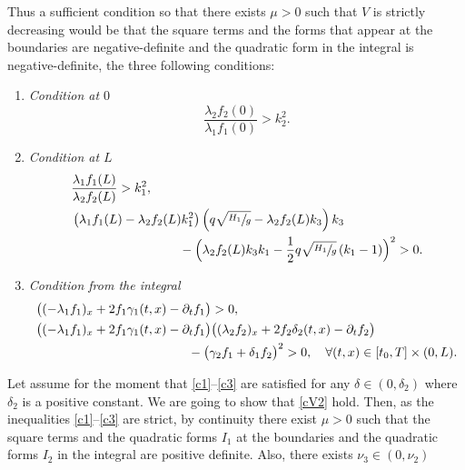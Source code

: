 Thus a sufficient condition {so that there exists $\mu>0$ such} that $V$ is strictly decreasing would be that the square terms and the forms that appear at the boundaries are negative-definite and the quadratic form in the integral is negative-definite, \ie the three following conditions:
\begin{enumerate}
\item \emph{Condition at $0$}
\begin{equation}
\label{c1}
\frac{\lambda_{2}f_{2}(0)}{\lambda_{1}f_{1}(0)}>k_{2}^{2}.
\end{equation}
\item \emph{Condition at $L$}
\begin{subequations}
\label{c2}
\begin{align}
\label{c2a}
&\frac{\lambda_{1}f_{1}(L)}{\lambda_{2}f_{2}(L)}>k_{1}^{2},\\
\label{c2b}
&\left(\lambda_{1}f_{1}(L)-\lambda_{2}f_{2}(L)k_{1}^{2}\right)\left(q\sqrt{\sfrac{H_{1}}{g}}-\lambda_{2}f_{2}(L)k_{3}\right)k_{3}\\
&\hspace*{3cm}-\Bigl(\lambda_{2}f_{2}(L)k_{3}k_{1}-\frac{1}{2}q\sqrt{\sfrac{H_{1}}{g}}\left(k_{1}-1\right)\Bigr)^{2}>0. \notag
\end{align}
\end{subequations}
\item \emph{Condition from the integral}
\begin{equation}\label{c3}
\begin{aligned}
&\bigl((-\lambda_{1}f_{1})_{x}+2f_{1}\gamma_{1}(t,x)-\partial_{t}f_{1}\bigr)>0,
\\
&\bigl((-\lambda_{1}f_{1})_{x}+2f_{1}\gamma_{1}(t,x)-\partial_{t}f_{1}\bigr)\bigl((\lambda_{2}f_{2})_{x}+2f_{2}\delta_{2}(t,x)-\partial_{t}f_{2}\bigr)
\\
& \hspace*{4.2cm}-\bigl(\gamma_{2}f_{1}+\delta_{1}f_{2}\bigr)^{2}>0,\quad\forall (t,x)\in [t_{0},T]\times(0,L).
\end{aligned}
\end{equation}
\end{enumerate}
Let assume for the moment that \eqref{c1}--\eqref{c3} are satisfied
for any $\delta\in(0,\delta_{{2}})$ where $\delta_{{2}}$ is a positive constant. {We are going to show that \eqref{cV2} hold.}
Then, as the inequalities \eqref{c1}--\eqref{c3} are strict, by continuity there exist $\mu>0$ such that the square terms and the quadratic forms {$I_{1}$} at the boundaries and the quadratic forms {$I_{2}$} in the integral are positive definite. {Also,} there exists $\nu_{3}\in(0,\nu_{2})$
